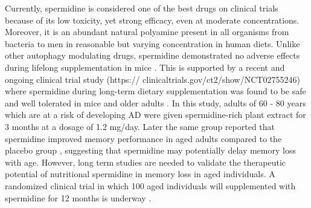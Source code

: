Currently, spermidine is considered one of the best drugs on clinical trials because of its low toxicity, yet strong efficacy, even at moderate concentrations. Moreover, it is an abundant natural polyamine present in all organisms from bacteria to men in reasonable but varying concentration in human diets. Unlike other autophagy modulating drugs, spermidine demonstrated no adverse effects during lifelong supplementation in mice \citep{Eisenberg2016a,Eisenberg2016b}. This is supported by a recent and ongoing clinical trial study (https:// clinicaltrials.gov/ct2/show/NCT02755246) where spermidine during long-term dietary supplementation was found to be safe and well tolerated in mice and older adults \citep{Schwarz2018}. In this study, adults of 60 - 80 years which are at a risk of developing AD were given spermidine-rich plant extract for 3 months at a dosage of 1.2 mg/day. Later the same group reported that spermidine improved memory performance in aged adults compared to the placebo group \citep{Wirth2018}, suggesting that spermidine may potentially delay memory loss with age. However, long term studies are needed to validate the therapeutic potential of nutritional spermidine in memory loss in aged individuals. A randomized clinical trial in which 100 aged individuals will supplemented with spermidine for 12 months is underway \citep{Wirth2019}.

